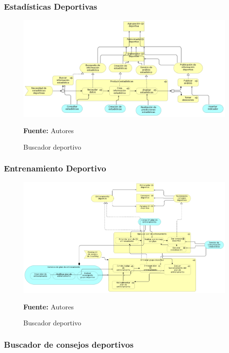 \clearpage

\subsubsection{Estadísticas Deportivas}

\begin{figure}[!htb]
  \begin{center}
    \includegraphics[width=11cm]{./imagenes/business_process/estadisticasdeportivas.png}
    \caption{Buscador deportivo}
    \label{fig:BF_BuscadorDeportivo}
    \textbf{Fuente:}  Autores
  \end{center}
\end{figure}

\subsubsection{Entrenamiento Deportivo}

\begin{figure}[!htb]
  \begin{center}
    \includegraphics[width=11cm]{./imagenes/business_process/entrenamientodeportivo.png}
    \caption{Buscador deportivo}
    \label{fig:BF_BuscadorDeportivo}
    \textbf{Fuente:}  Autores
  \end{center}
\end{figure}

\subsubsection{Buscador de consejos deportivos}

